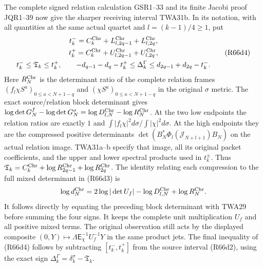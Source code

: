 The complete signed relation calculation GSR1--33 and its
finite Jacobi proof JQR1--39 now give the sharper receiving
interval TWA31b. In its notation, with all quantities at
the same actual quartet and $l=(k-1)/4\geq1$, put
\[
\begin{gathered}
 t_k^-=C_k^{\rm Chr}+L_{l,2q-1}^{\rm Chr}+L_{l,2q}^{\rm Chr},\\
 t_k^+=C_k^{\rm Chr}+U_{l,2q-1}^{\rm Chr}+U_{l,2q}^{\rm Chr},\\
 t_k^-\leq\mathfrak T_k\leq t_k^+,\qquad
 -d_{q-1}-d_q-t_k^+\leq\Delta_k^\Gamma
                 \leq d_{2q-1}+d_{2q}-t_k^-.
\end{gathered}\tag{R66d4}
\]
Here $R_N^{\rm Chr}$ is the determinant ratio of the complete
relation frames $(f_l\chi S^a)_{0\leq a<N+1-q}$ and
$(\chi S^a)_{0\leq a<N+1-q}$ in the original $\sigma$ metric.
The exact source/relation block determinant gives
$\log\det G_N^f-\log\det G_N^\sigma
=\log D_{l,N}^{\rm Chr}-\log R_N^{\rm Chr}$.
At the two low endpoints the relation ratios are exactly
$1$ and $\int|f_l\chi|^2d\sigma/\int|\chi|^2d\sigma$.
At the high endpoints they are the compressed positive
determinants $\det(B_N^*\Phi_l(\mathcal J_{N+l+1})B_N)$
on the actual relation image. TWA31a--b specify that image,
all its original packet coefficients, and the upper and
lower spectral products used in $t_k^\pm$.
Thus $\mathfrak T_k=C_k^{\rm Chr}
+\log R_{2q-1}^{\rm Chr}+\log R_{2q}^{\rm Chr}$.
The identity relating each compression to the full mixed
determinant in (R66d3) is
\[
 \log d_N^{\rm Chr}=2\log|\det U_f|
                 -\log D_{l,N}^{\rm Chr}+\log R_N^{\rm Chr}.
\]
It follows directly by equating the preceding block
determinant with TWA29 before summing the four signs.
It keeps the complete unit multiplication $U_f$ and all
positive mixed terms. The original observation still acts
by the displayed composite $(0,Y)\mapsto
\Lambda\mathsf E_\chi^{-1}U_f^{-1}Y$ in the same product jets.
The final inequality of (R66d4) follows by subtracting
$[t_k^-,t_k^+]$ from the source interval (R66d2), using
the exact sign $\Delta_k^\Gamma=\delta_k^\sigma-\mathfrak T_k$.

